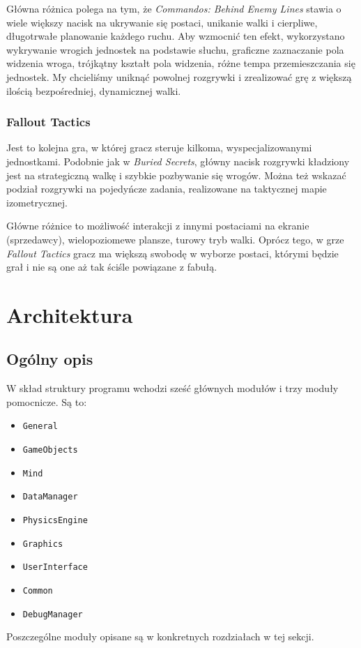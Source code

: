 \documentclass[licencjacka]{pracamgr}
\begin{document}
      Główna różnica polega na tym, że \emph{Commandos: Behind Enemy Lines} stawia o wiele większy nacisk na ukrywanie się postaci, unikanie walki
      i cierpliwe, długotrwałe planowanie każdego ruchu. Aby wzmocnić ten efekt, wykorzystano wykrywanie wrogich jednostek na podstawie słuchu,
      graficzne zaznaczanie pola widzenia wroga, trójkątny kształt pola widzenia, różne tempa przemieszczania się jednostek.
      My chcieliśmy uniknąć powolnej rozgrywki i zrealizować grę z większą ilością bezpośredniej, dynamicznej walki.

    \subsection{Fallout Tactics}
      Jest to kolejna gra, w której gracz steruje kilkoma, wyspecjalizowanymi jednostkami. Podobnie jak w \emph{Buried Secrets}, główny nacisk rozgrywki
      kładziony jest na strategiczną walkę i szybkie pozbywanie się wrogów. Można też wskazać podział rozgrywki na pojedyńcze zadania,
      realizowane na taktycznej mapie izometrycznej.

      Główne różnice to możliwość interakcji z innymi postaciami na ekranie (sprzedawcy), wielopoziomewe plansze, turowy tryb walki. Oprócz tego,
      w grze \emph{Fallout Tactics} gracz ma większą swobodę w wyborze postaci, którymi będzie grał i nie są one aż tak ściśle powiązane z fabułą.


\chapter{Architektura}
  \section{Ogólny opis}
    W skład struktury programu wchodzi sześć głównych modułów i trzy moduły pomocnicze. Są to:
    \begin{itemize}
      \item \texttt{General}
      \item \texttt{GameObjects}
      \item \texttt{Mind}
      \item \texttt{DataManager}
      \item \texttt{PhysicsEngine}
      \item \texttt{Graphics}
      \item \texttt{UserInterface}
      \item \texttt{Common}
      \item \texttt{DebugManager}
    \end{itemize}
    Poszczególne moduły opisane są w konkretnych rozdziałach w tej sekcji.
\end{document}
